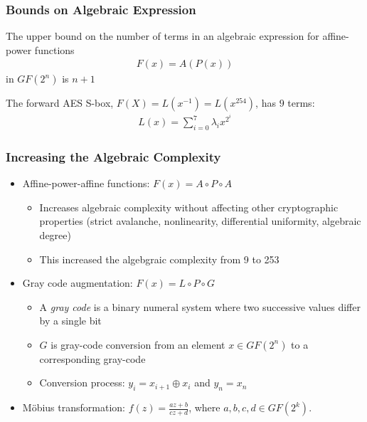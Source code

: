 \documentclass[handout]{beamer}
\begin{document}

\begin{frame}
	\frametitle{Bounds on Algebraic Expression}
	The upper bound on the number of terms in an algebraic expression for affine-power functions 
	\begin{align*}
	F(x) = A(P(x))
	\end{align*}
	in $GF(2^n)$ is $n + 1$
	
	\medskip
	
	The forward AES S-box, $F(X) = L(x^{-1}) = L(x^{254})$, has $9$ terms:
	\begin{align*}
		L(x) = \sum_{i=0}^{7}\lambda_i x^{2^{i}}
	\end{align*}
\end{frame}

\begin{frame}
	\frametitle{Increasing the Algebraic Complexity}
	\begin{itemize}
		\item Affine-power-affine functions: $F(x) = A \circ P \circ A$
		\begin{itemize}
			\item Increases algebraic complexity without affecting other cryptographic properties (strict avalanche, nonlinearity, differential uniformity, algebraic degree)
			\item This increased the algebgraic complexity from 9 to 253
		\end{itemize}
		\item Gray code augmentation: $F(x) = L \circ P \circ G$
		\begin{itemize}
			\item A \emph{gray code} is a binary numeral system where two successive values differ by a single bit
			\item $G$ is gray-code conversion from an element $x \in GF(2^n)$ to a corresponding gray-code
			\item Conversion process: $y_i = x_{i+1} \oplus x_i$ and $y_n = x_n$
		\end{itemize}
		\item M\"{o}bius transformation: $f(z) = \frac{az + b}{cz + d}$, where $a,b,c,d \in GF(2^k)$.
	\end{itemize}
\end{frame}
\end{document}
